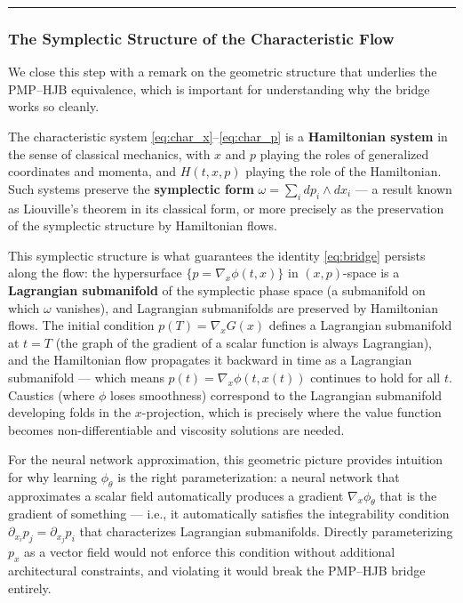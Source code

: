 \documentclass{article}
\begin{document}
\medskip\hrule\medskip

\begin{physicsinsightbox}
\subsubsection{The Symplectic Structure of the Characteristic Flow}
\label{subsec:lagrangian-submanifold}

We close this step with a remark on the geometric structure that underlies the
PMP--HJB equivalence, which is important for understanding why the bridge works
so cleanly.

The characteristic system \eqref{eq:char_x}--\eqref{eq:char_p} is a
\textbf{Hamiltonian system} in the sense of classical mechanics, with $x$ and
$p$ playing the roles of generalized coordinates and momenta, and $H(t,x,p)$
playing the role of the Hamiltonian. Such systems preserve the \textbf{symplectic
form} $\omega = \sum_i dp_i \wedge dx_i$ --- a result known as Liouville's
theorem in its classical form, or more precisely as the preservation of the
symplectic structure by Hamiltonian flows.

This symplectic structure is what guarantees the identity \eqref{eq:bridge}
persists along the flow: the hypersurface $\{p = \nabla_x\phi(t,x)\}$ in
$(x,p)$-space is a \textbf{Lagrangian submanifold} of the symplectic phase
space (a submanifold on which $\omega$ vanishes), and Lagrangian submanifolds
are preserved by Hamiltonian flows. The initial condition $p(T) = \nabla_x G(x)$
defines a Lagrangian submanifold at $t = T$ (the graph of the gradient of a
scalar function is always Lagrangian), and the Hamiltonian flow propagates it
backward in time as a Lagrangian submanifold --- which means $p(t) =
\nabla_x\phi(t, x(t))$ continues to hold for all $t$. Caustics (where $\phi$
loses smoothness) correspond to the Lagrangian submanifold developing folds in
the $x$-projection, which is precisely where the value function becomes
non-differentiable and viscosity solutions are needed.

For the neural network approximation, this geometric picture provides intuition
for why learning $\phi_\theta$ is the right parameterization: a neural network
that approximates a scalar field automatically produces a gradient
$\nabla_x\phi_\theta$ that is the gradient of something --- i.e., it
automatically satisfies the integrability condition $\partial_{x_i} p_j =
\partial_{x_j} p_i$ that characterizes Lagrangian submanifolds. Directly
parameterizing $p_x$ as a vector field would not enforce this condition without
additional architectural constraints, and violating it would break the
PMP--HJB bridge entirely.
\end{physicsinsightbox}
\end{document}
